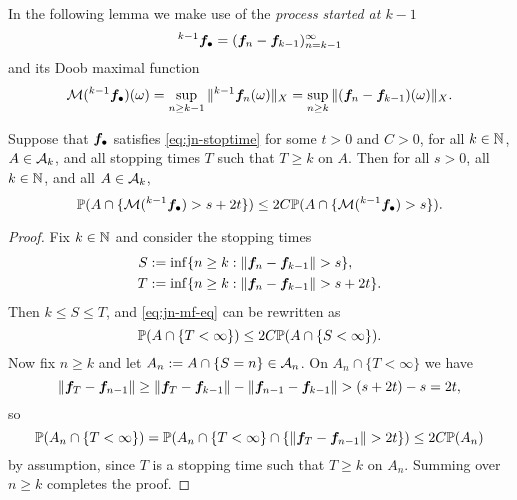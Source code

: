 In the following lemma we make use of the \emph{process started at $k-1$}
\begin{equation*}
  {}^{k-1}\mb{f}_{\bullet} = (\mb{f}_n - \mb{f}_{k-1})_{n = k-1}^{\infty}
\end{equation*}
and its Doob maximal function
\begin{equation*}
  \mc{M}({}^{k-1}\mb{f}_{\bullet})(\omega) = \sup_{n \geq k-1} \|{}^{k-1}\mb{f}_n(\omega)\|_X = \sup_{n \geq k} \|(\mb{f}_n - \mb{f}_{k-1})(\omega)\|_X.
\end{equation*}

\begin{lem}\label{lem:jn-mf}
  Suppose that $\mb{f}_{\bullet}$ satisfies \eqref{eq:jn-stoptime} for some $t > 0$ and $C > 0$, for all $k \in \N$, $A \in \mc{A}_k$, and all stopping times $T$ such that $T \geq k$ on $A$.
  Then for all $s > 0$, all $k \in \N$, and all $A \in \mc{A}_{k}$,
  \begin{equation}\label{eq:jn-mf-eq}
    \P(A \cap \{ \mc{M}({}^{k-1} \mb{f}_{\bullet}) > s + 2t \}) \leq 2C \P(A \cap \{  \mc{M}({}^{k-1} \mb{f}_{\bullet}) > s \}).
  \end{equation}
\end{lem}

\begin{proof}
  Fix $k \in \N$ and consider the stopping times
  \begin{equation*}
    \begin{aligned}
      S &:= \inf\{n \geq k : \|\mb{f}_n - \mb{f}_{k-1}\| > s\}, \\
      T &:= \inf\{n \geq k : \|\mb{f}_n - \mb{f}_{k-1}\| > s + 2t\}.
    \end{aligned}
  \end{equation*}
  Then $k \leq S \leq T$, and \eqref{eq:jn-mf-eq} can be rewritten as
  \begin{equation*}
    \P(A \cap \{T < \infty\}) \leq 2C \P(A \cap \{S < \infty\}).
  \end{equation*}
  Now fix $n \geq k$ and let $A_n := A \cap \{S = n\} \in \mc{A}_n$. 
  On $A_n \cap \{T < \infty\}$ we have
  \begin{equation*}
    \|\mb{f}_{T} - \mb{f}_{n-1}\| \geq \|\mb{f}_{T} - \mb{f}_{k-1}\| - \|\mb{f}_{n-1} - \mb{f}_{k-1}\| > (s + 2t) - s = 2t,
  \end{equation*}
  so
  \begin{equation*}
    \P(A_n \cap \{T < \infty\}) = \P(A_n \cap \{T < \infty\} \cap \{\|\mb{f}_{T} - \mb{f}_{n-1}\| > 2t\} )
    \leq 2C \P(A_n)
  \end{equation*}
  by assumption, since $T$ is a stopping time such that $T \geq k$ on $A_{n}$.
  Summing over $n \geq k$ completes the proof.
\end{proof}

